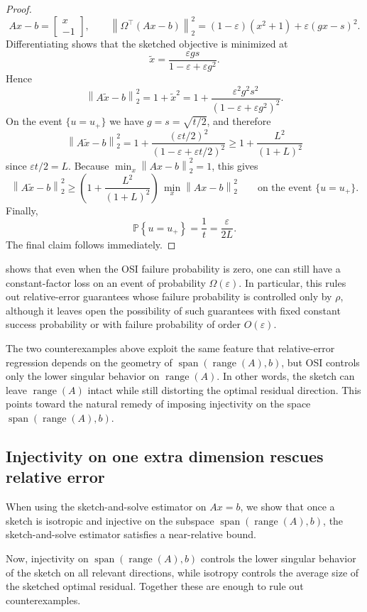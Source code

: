 \documentclass[onefignum,onetabnum]{siamart251216}
\newcommand{\Prob}{\mathbb{P}}
\newcommand{\norm}[1]{\left\lVert #1 \right\rVert}
\newcommand{\range}{\operatorname{range}}
\newcommand{\eps}{\varepsilon}
\begin{document}
\begin{proof}
\[
Ax-b = \begin{bmatrix}x\\-1\end{bmatrix},
\qquad
\norm{\Omega^\top(Ax-b)}_2^2 = (1-\eps)(x^2+1) + \eps(gx-s)^2.
\]
Differentiating shows that the sketched objective is minimized at
\[
\widetilde x = \frac{\eps g s}{1-\eps + \eps g^2}.
\]
Hence
\[
\norm{A\widetilde x-b}_2^2 = 1+\widetilde x^2 = 1 + \frac{\eps^2 g^2 s^2}{(1-\eps+\eps g^2)^2}.
\]
On the event $\{u=u_+\}$ we have $g=s=\sqrt{t/2}$, and therefore
\[
\norm{A\widetilde x-b}_2^2
= 1 + \frac{(\eps t/2)^2}{(1-\eps+\eps t/2)^2} \ge 1+\frac{L^2}{(1+L)^2}
\]
since $\eps t/2= L$. Because $\min_x \norm{Ax-b}_2^2 = 1$, this gives
\[
\norm{A\widetilde x-b}_2^2 \ge \left(1 + \frac{L^2}{(1+L)^2}\right)\,\min_x \norm{Ax-b}_2^2
\qquad \text{on the event } \{u=u_+\}.
\]
Finally,
\[
\Prob\!\left\{u=u_+\right\} = \frac{1}{t} = \frac{\eps}{2L}.
\]
The final claim follows immediately. 
\end{proof}

 shows that even when the OSI failure probability is zero, one can still have a constant-factor loss on an event of probability $\Omega(\eps)$.  In particular, this rules out relative-error guarantees whose failure probability is controlled only by $\rho$, although it leaves open the possibility of such guarantees with fixed constant success probability or with failure probability of order $O(\eps)$.

The two counterexamples above exploit the same feature that relative-error regression depends on the geometry of $\operatorname{span}(\range(A),b)$,  but OSI controls only the lower singular behavior on $\range(A)$.  In other words, the sketch can leave $\range(A)$ intact while still distorting the optimal residual direction.  This points toward the natural remedy of imposing injectivity on the space $\operatorname{span}(\range(A),b)$.

\subsection{Injectivity on one extra dimension rescues relative error}\label{sec:positiveForLS}
When using the sketch-and-solve estimator on $Ax=b$,  we show that once a sketch is isotropic and injective on the subspace $\operatorname{span}(\range(A),b)$, the sketch-and-solve estimator satisfies a near-relative bound. 

Now,  injectivity on $\operatorname{span}(\range(A),b)$ controls the lower singular behavior of the sketch on all relevant directions, while isotropy controls the average size of the sketched optimal residual.  Together these are enough to rule out counterexamples.
\end{document}
